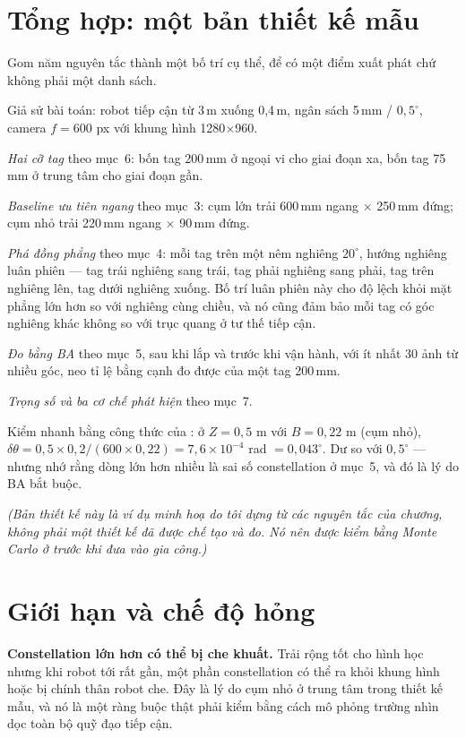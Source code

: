 \documentclass[../../marker.tex]{subfiles}
\begin{document}
\section{Tổng hợp: một bản thiết kế mẫu}

Gom năm nguyên tắc thành một bố trí cụ thể, để có một điểm xuất phát chứ không phải một danh sách.

Giả sử bài toán: robot tiếp cận từ 3\,m xuống 0,4\,m, ngân sách 5\,mm / \(0{,}5^\circ\), camera \(f = 600\) px với khung hình 1280\(\times\)960.

\emph{Hai cỡ tag} theo mục~6: bốn tag 200\,mm ở ngoại vi cho giai đoạn xa, bốn tag 75\,mm ở trung tâm cho giai đoạn gần.

\emph{Baseline ưu tiên ngang} theo mục~3: cụm lớn trải 600\,mm ngang \(\times\) 250\,mm đứng; cụm nhỏ trải 220\,mm ngang \(\times\) 90\,mm đứng.

\emph{Phá đồng phẳng} theo mục~4: mỗi tag trên một nêm nghiêng \(20^\circ\), hướng nghiêng luân phiên --- tag trái nghiêng sang trái, tag phải nghiêng sang phải, tag trên nghiêng lên, tag dưới nghiêng xuống. Bố trí luân phiên này cho độ lệch khỏi mặt phẳng lớn hơn so với nghiêng cùng chiều, và nó cũng đảm bảo mỗi tag có góc nghiêng khác không so với trục quang ở tư thế tiếp cận.

\emph{Đo bằng BA} theo mục~5, sau khi lắp và trước khi vận hành, với ít nhất 30 ảnh từ nhiều góc, neo tỉ lệ bằng cạnh đo được của một tag 200\,mm.

\emph{Trọng số và ba cơ chế phát hiện} theo mục~7.

Kiểm nhanh bằng công thức của : ở \(Z = 0{,}5\) m với \(B = 0{,}22\) m (cụm nhỏ), \(\delta\theta = 0{,}5 \times 0{,}2/(600 \times 0{,}22) = 7{,}6\times10^{-4}\) rad \(= 0{,}043^\circ\). Dư so với \(0{,}5^\circ\) --- nhưng nhớ rằng dòng lớn hơn nhiều là sai số constellation ở mục~5, và đó là lý do BA bắt buộc.

\emph{(Bản thiết kế này là ví dụ minh hoạ do tôi dựng từ các nguyên tắc của chương, không phải một thiết kế đã được chế tạo và đo. Nó nên được kiểm bằng Monte Carlo ở  trước khi đưa vào gia công.)}

\section{Giới hạn và chế độ hỏng}

\textbf{Constellation lớn hơn có thể bị che khuất.} Trải rộng tốt cho hình học nhưng khi robot tới rất gần, một phần constellation có thể ra khỏi khung hình hoặc bị chính thân robot che. Đây là lý do cụm nhỏ ở trung tâm trong thiết kế mẫu, và nó là một ràng buộc thật phải kiểm bằng cách mô phỏng trường nhìn dọc toàn bộ quỹ đạo tiếp cận.
\end{document}
